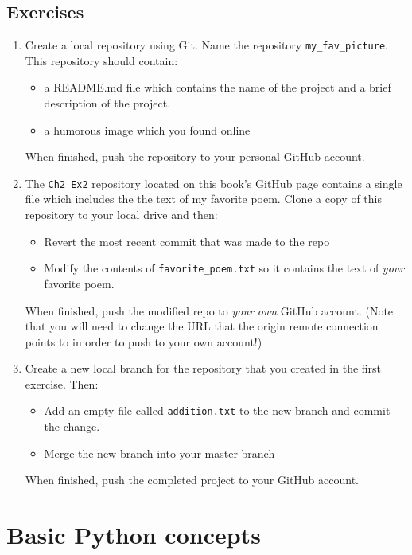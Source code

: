 \documentclass{book}
\begin{document}
\section{Exercises}
\begin{enumerate}
	\item Create a local repository using Git. Name the repository \texttt{my\_fav\_picture}. This repository should contain:
	\begin{itemize}
		\item a README.md file which contains the name of the project and a brief description of the project. 
		\item a humorous image which you found online 
	\end{itemize}
		When finished, push the repository to your personal GitHub account.
	\item The \texttt{Ch2\_Ex2} repository located on this book's GitHub page contains a single file which includes the the text of my favorite poem. Clone a copy of this repository to your local drive and then:
	\begin{itemize}
		\item Revert the most recent commit that was made to the repo
		\item Modify the contents of \texttt{favorite\_poem.txt} so it contains the text of \textit{your} favorite poem.
	\end{itemize}
	When finished, push the modified repo to \textit {your own} GitHub account. (Note that you will need to change the URL that the origin remote connection points to in order to push to your own account!)
	\item Create a new local branch for the repository that you created in the first exercise. Then:
	\begin {itemize}
		\item Add an empty file called \texttt{addition.txt} to the new branch and commit the change.
		\item Merge the new branch into your master branch
	\end {itemize}
	When finished, push the completed project to your GitHub account.
\end{enumerate}

\chapter{Basic Python concepts}
\end{document}
